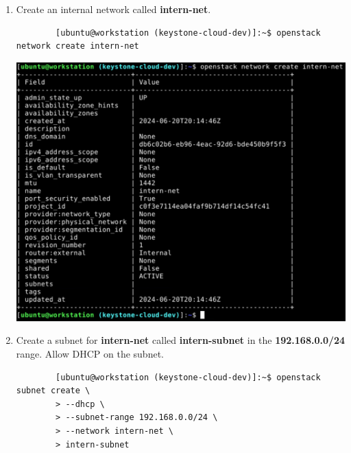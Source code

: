 \documentclass[letterpaper, 12pt]{article}
\begin{document}
\begin{enumerate}
    \item Create an internal network called \textbf{intern-net}.
    \begin{lstlisting}
        [ubuntu@workstation (keystone-cloud-dev)]:~$ openstack network create intern-net
    \end{lstlisting}

    \begin{center}
        \includegraphics[width=\linewidth]{images/part1/step24.png}
    \end{center}

    \item Create a subnet for \textbf{intern-net} called \textbf{intern-subnet} in the \textbf{192.168.0.0/24} range. Allow DHCP on
    the subnet.
    \begin{lstlisting}
        [ubuntu@workstation (keystone-cloud-dev)]:~$ openstack subnet create \
        > --dhcp \
        > --subnet-range 192.168.0.0/24 \
        > --network intern-net \
        > intern-subnet
    \end{lstlisting}


\end{enumerate}
\end{document}
